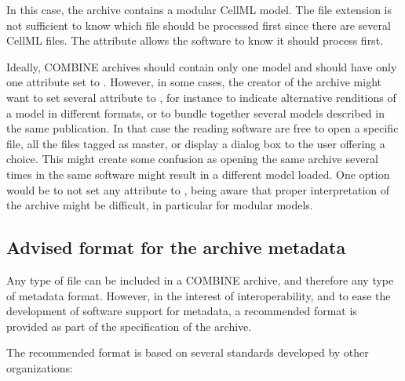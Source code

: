 In this case, the archive contains a modular CellML model. The file extension  is not sufficient to know which file should be processed first since there are several CellML files. The  attribute allows the software
to know it should process  first.

Ideally, COMBINE archives should contain only one model and should have only one  attribute set to . However, in some cases, the creator of the archive might want to set several  attribute to , for instance to indicate alternative renditions of a model in different formats, or to bundle together several models described in the same publication. In that case the reading software are free to open a specific file, all the files tagged as master, or display a dialog box to the user offering a choice. This might create some confusion as opening the same archive several times in the same software might result in a different model loaded. One option would be to not set any  attribute to , being aware that proper interpretation of the archive might be difficult, in particular for modular models.  


\subsection{Advised format for the archive metadata}

Any type of file can be included in a COMBINE archive, and therefore any 
type of metadata format. However, in the interest of interoperability, 
and to ease the development of software support for metadata, a 
recommended format is provided as part of the specification of the 
archive. 

The recommended format is based on several standards developed by other 
organizations: 

